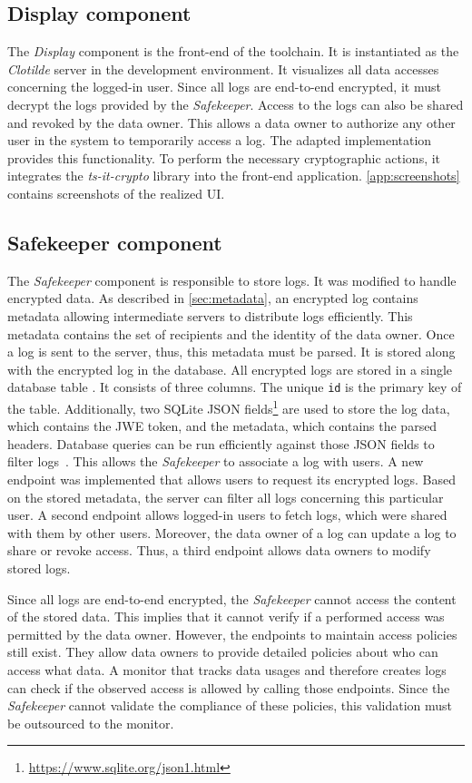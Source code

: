 \documentclass[../main.tex]{subfiles}
\begin{document}
\subsection{Display component}
The \emph{Display} component is the front-end of the toolchain.
It is instantiated as the \emph{Clotilde} server in the development environment.
It visualizes all data accesses concerning the logged-in user.
Since all logs are end-to-end encrypted, it must decrypt the logs provided by the \emph{Safekeeper}.
Access to the logs can also be shared and revoked by the data owner.
This allows a data owner to authorize any other user in the system to temporarily access a log.
The adapted implementation provides this functionality.
To perform the necessary cryptographic actions, it integrates the \emph{ts-it-crypto} library into the front-end application.
\cref{app:screenshots} contains screenshots of the realized UI.

\subsection{Safekeeper component}
\label{sec:implemenation-safekeeper}
The \emph{Safekeeper} component is responsible to store logs.
It was modified to handle encrypted data.
As described in \cref{sec:metadata}, an encrypted log contains metadata allowing intermediate servers to distribute logs efficiently.
This metadata contains the set of recipients and the identity of the data owner.
Once a log is sent to the server, thus, this metadata must be parsed.
It is stored along with the encrypted log in the database.
All encrypted logs are stored in a single database table . 
It consists of three columns.
The unique \verb|id| is the primary key of the table.
Additionally, two SQLite JSON fields\footnote{\url{https://www.sqlite.org/json1.html}} are used to store the log data, which contains the JWE token, and the metadata, which contains the parsed headers.
Database queries can be run efficiently against those JSON fields to filter logs~\cite{Shang2021}.
This allows the \emph{Safekeeper} to associate a log with users.
A new endpoint was implemented that allows users to request its encrypted logs.
Based on the stored metadata, the server can filter all logs concerning this particular user.
A second endpoint allows logged-in users to fetch logs, which were shared with them by other users.
Moreover, the data owner of a log can update a log to share or revoke access.
Thus, a third endpoint allows data owners to modify stored logs.

Since all logs are end-to-end encrypted, the \emph{Safekeeper} cannot access the content of the stored data.
This implies that it cannot verify if a performed access was permitted by the data owner.
However, the endpoints to maintain access policies still exist.
They allow data owners to provide detailed policies about who can access what data.
A monitor that tracks data usages and therefore creates logs can check if the observed access is allowed by calling those endpoints.
Since the \emph{Safekeeper} cannot validate the compliance of these policies, this validation must be outsourced to the monitor.
\end{document}
